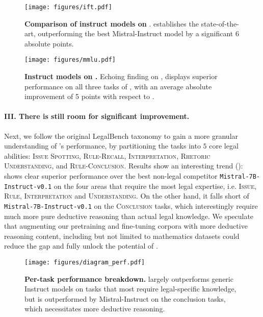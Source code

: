 \begin{figure}
    \centering    \texttt{[image: figures/ift.pdf]}
    \caption{\textbf{Comparison of instruct models on \legalbench{}}. \ourmodelift{} establishes the state-of-the-art, outperforming the best Mistral-Instruct model by a significant 6 absolute points.}
    \label{fig:ift_comparison}
\end{figure}

\begin{figure}[!h]
        \centering
        \texttt{[image: figures/mmlu.pdf]}
        \caption{\textbf{Instruct models on \legalmmlu{}.} Echoing finding on \legalbench{}, \ourmodelift{} displays superior performance on all three tasks of \legalmmlu{}, with an average absolute improvement of 5 points with respect to \mistralinstructone. }
        \label{fig:mmlu_benchmark}
\end{figure}
\paragraph{III. There is still room for significant improvement.} Next, we follow the original LegalBench taxonomy \citep{guha2023legalbench} to gain a more granular understanding of \ourmodelift{}'s performance, by partitioning the tasks into $5$ core legal abilities: \textsc{Issue Spotting}, \textsc{Rule-Recall}, \textsc{Interpretation}, \textsc{Rhetoric Understanding}, and \textsc{Rule-Conclusion}. Results show an interesting trend (): \ourmodelift{} shows clear superior performance over the best non-legal competitor \texttt{Mistral-7B-Instruct-v0.1} on the four areas that require the most legal expertise, i.e. \textsc{Issue}, \textsc{Rule}, \textsc{Interpretation} and \textsc{Understanding}. On the other hand, it falls short of \texttt{Mistral-7B-Instruct-v0.1} on the \textsc{Conclusion} tasks, which interestingly require much more pure deductive reasoning than actual legal knowledge. We speculate that augmenting our pretraining and fine-tuning corpora with more deductive reasoning content, including but not limited to mathematics datasets could reduce the gap and fully unlock the potential of \ourmodelift{}.

\begin{figure}[!h]
    \centering
    \texttt{[image: figures/diagram\_perf.pdf]}
    \caption{\textbf{Per-task performance breakdown.} \ourmodelift{} largely outperforms generic Instruct models on tasks that most require legal-specific knowledge, but is outperformed by Mistral-Instruct on the conclusion tasks, which necessitates more deductive reasoning.}
    \label{fig:spider_chat}
\end{figure}

